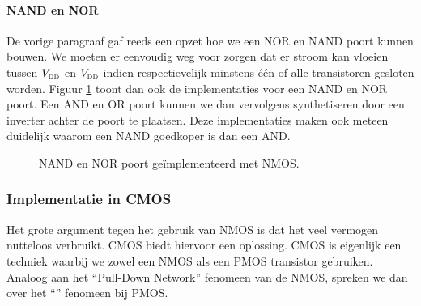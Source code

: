 \paragraph{NAND en NOR}
De vorige paragraaf gaf reeds een opzet hoe we een NOR en NAND poort kunnen bouwen. We moeten er eenvoudig weg voor zorgen dat er stroom kan vloeien tussen $V_{\mbox{\tiny DD}}$ en $V_{\mbox{\tiny DD}}$ indien respectievelijk minstens \'e\'en of alle transistoren gesloten worden. Figuur \ref{fig:nandNorNmos} toont dan ook de implementaties voor een NAND en NOR poort. Een AND en OR poort kunnen we dan vervolgens synthetiseren door een inverter achter de poort te plaatsen. Deze implementaties maken ook meteen duidelijk waarom een NAND goedkoper is dan een AND.
\begin{figure}
\centering
{}
\caption{NAND en NOR poort ge\"implementeerd met NMOS.}
\label{fig:nandNorNmos}
\end{figure}
\subsubsection{Implementatie in CMOS}
Het grote argument tegen het gebruik van NMOS is dat het veel vermogen nutteloos verbruikt. CMOS biedt hiervoor een oplossing. CMOS is eigenlijk een techniek waarbij we zowel een NMOS als een PMOS transistor gebruiken. Analoog aan het ``Pull-Down Network'' fenomeen van de NMOS, spreken we dan over het ``'' fenomeen bij PMOS.
